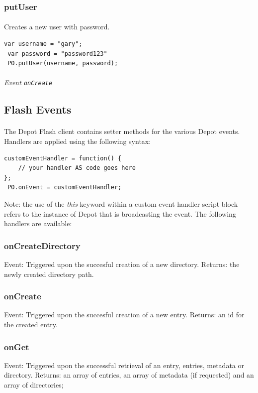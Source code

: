\documentclass{report}
\begin{document}
\subsubsection{putUser}
\paragraph{}
Creates a new user with password.

\begin{Verbatim}[frame=single]
 var username = "gary";
 var password = "password123"
 PO.putUser(username, password);
\end{Verbatim}

\paragraph{}
\textit{Event \texttt{onCreate}}


\subsection{Flash Events}
\paragraph{}
The Depot Flash client contains setter methods for the various Depot events. Handlers are applied using the following syntax:

\begin{Verbatim}[frame=single]
 customEventHandler = function() {
	// your handler AS code goes here
};
 PO.onEvent = customEventHandler;
\end{Verbatim}

Note: the use of the \textit{this} keyword within a custom event handler script block refers to the instance of Depot that is broadcasting the event. The following handlers are available:

\subsubsection{onCreateDirectory}
Event: Triggered upon the succesful creation of a new directory.
Returns: the newly created directory path.
\subsubsection{onCreate}
Event: Triggered upon the succesful creation of a new entry.
Returns: an id for the created entry.
\subsubsection{onGet}
Event: Triggered upon the successful retrieval of an entry, entries, metadata or directory.
Returns: an array of entries, an array of metadata (if requested) and an array of directories;
\end{document}
